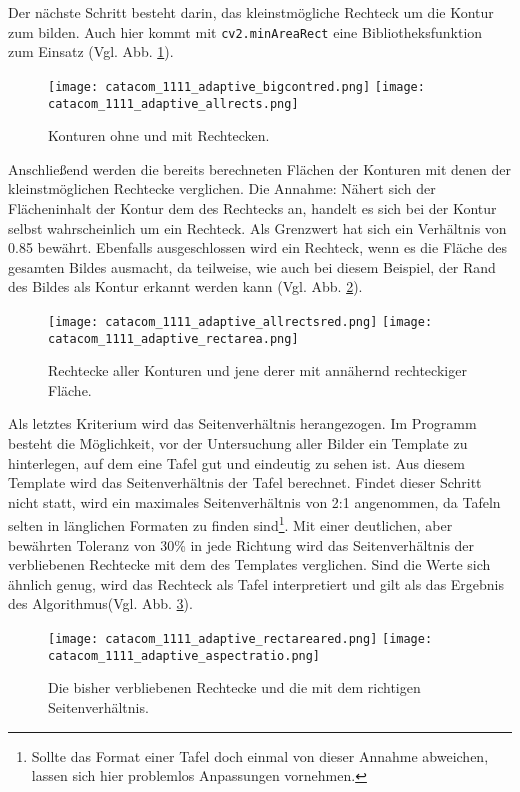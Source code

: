 Der nächste Schritt besteht darin, das kleinstmögliche Rechteck um die Kontur zum bilden. Auch hier kommt mit \verb|cv2.minAreaRect| eine Bibliotheksfunktion zum Einsatz (Vgl. Abb. \ref{fig:adaptiverectangles}).
\begin{figure}[h!]
\texttt{[image: catacom\_1111\_adaptive\_bigcontred.png]}
\texttt{[image: catacom\_1111\_adaptive\_allrects.png]}
\caption{Konturen ohne und mit Rechtecken.}
\label{fig:adaptiverectangles}
\end{figure}

Anschließend werden die bereits berechneten Flächen der Konturen mit denen der kleinstmöglichen Rechtecke verglichen. Die Annahme: Nähert sich der Flächeninhalt der Kontur dem des Rechtecks an, handelt es sich bei der Kontur selbst wahrscheinlich um ein Rechteck. Als Grenzwert hat sich ein Verhältnis von 0.85 bewährt. Ebenfalls ausgeschlossen wird ein Rechteck, wenn es die Fläche des gesamten Bildes ausmacht, da teilweise, wie auch bei diesem Beispiel, der Rand des Bildes als Kontur erkannt werden kann (Vgl. Abb. \ref{fig:adaptivrect}).
\begin{figure}[h!]
\texttt{[image: catacom\_1111\_adaptive\_allrectsred.png]}
\texttt{[image: catacom\_1111\_adaptive\_rectarea.png]}
\caption{Rechtecke aller Konturen und jene derer mit annähernd rechteckiger Fläche.}
\label{fig:adaptivrect}
\end{figure}

Als letztes Kriterium wird das Seitenverhältnis herangezogen. Im Programm besteht die Möglichkeit, vor der Untersuchung aller Bilder ein Template zu hinterlegen, auf dem eine Tafel gut und eindeutig zu sehen ist. Aus diesem Template wird das Seitenverhältnis der Tafel berechnet. Findet dieser Schritt nicht statt, wird ein maximales Seitenverhältnis von 2:1 angenommen, da Tafeln selten in länglichen Formaten zu finden sind\footnote{Sollte das Format einer Tafel doch einmal von dieser Annahme abweichen, lassen sich hier problemlos Anpassungen vornehmen.}. Mit einer deutlichen, aber bewährten Toleranz von 30\% in jede Richtung wird das Seitenverhältnis der verbliebenen Rechtecke mit dem des Templates verglichen. Sind die Werte sich ähnlich genug, wird das Rechteck als Tafel interpretiert und gilt als das Ergebnis des Algorithmus(Vgl. Abb. \ref{fig:aspectratio}).
\begin{figure}[h!]
\texttt{[image: catacom\_1111\_adaptive\_rectareared.png]}
\texttt{[image: catacom\_1111\_adaptive\_aspectratio.png]}
\caption{Die bisher verbliebenen Rechtecke und die mit dem richtigen Seitenverhältnis.}
\label{fig:aspectratio}
\end{figure}
 
